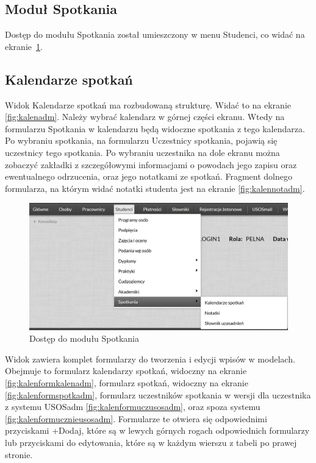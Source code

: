 \documentclass[licencjacka]{pracamgr}
\begin{document}
\subsection{Moduł Spotkania}
Dostęp do modułu Spotkania został umieszczony w menu Studenci, co widać na ekranie~\ref{fig:modspoadm}.

\subsection{Kalendarze spotkań}
Widok Kalendarze spotkań ma rozbudowaną strukturę. Widać to na ekranie \ref{fig:kalenadm}. Należy wybrać kalendarz w górnej części ekranu. Wtedy na 
formularzu Spotkania w kalendarzu będą widoczne spotkania z tego kalendarza. Po wybraniu spotkania, na formularzu Uczestnicy spotkania, pojawią się 
uczestnicy tego spotkania. Po wybraniu uczestnika na dole ekranu można zobaczyć zakładki z szczegółowymi informacjami o powodach jego zapisu oraz 
ewentualnego odrzucenia, oraz jego notatkami ze spotkań. Fragment dolnego formularza, na którym widać notatki studenta jest na ekranie 
\ref{fig:kalennotadm}.

\begin{figure}[!]
  \includegraphics[width=\linewidth]{spotkaniaadm.jpg}
  \caption{Dostęp do modułu Spotkania}
  \label{fig:modspoadm}
\end{figure}

Widok zawiera komplet formularzy do tworzenia i edycji wpisów w modelach. Obejmuje to formularz kalendarzy spotkań, widoczny na ekranie 
\ref{fig:kalenformkalenadm}, formularz spotkań, widoczny na ekranie \ref{fig:kalenformspotkadm}, formularz uczestników spotkania w wersji dla uczestnika 
z systemu USOSadm \ref{fig:kalenformuczusosadm}, oraz spoza systemu \ref{fig:kalenformucznieusosadm}. Formularze te otwiera się odpowiednimi przyciskami 
\textsf{+Dodaj}, które są w lewych górnych rogach odpowiednich formularzy lub przyciskami do edytowania, które są w każdym wierszu z tabeli po prawej 
stronie.
\end{document}
